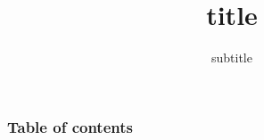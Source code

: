 \documentclass[9pt, xcolor=dvipsnames]{beamer}
\title[short]{title}
\subtitle{subtitle}
\begin{document}


\begin{frame}%
	\frametitle{Table of contents}
	\tableofcontents[hideallsubsections]   %
\end{frame}


% 


\end{document}
